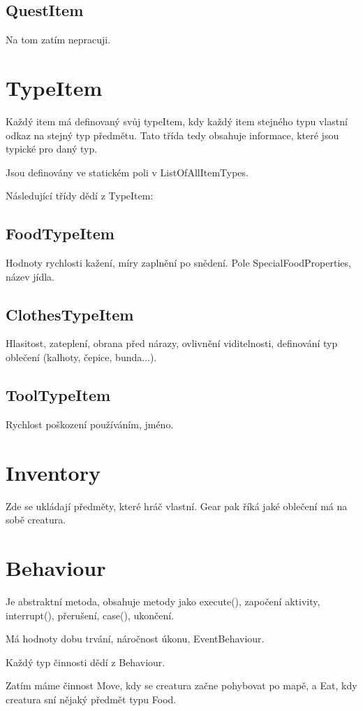 \documentclass[12pt,a4paper]{report}
\begin{document}
\subsection{QuestItem}
Na tom zatím nepracuji.

\section{TypeItem}
Každý item má definovaný svůj typeItem, kdy každý item stejného typu vlastní odkaz na stejný typ předmětu. Tato třída tedy obsahuje informace, které jsou typické pro daný typ.

Jsou definovány ve statickém poli v ListOfAllItemTypes.

Následující třídy dědí z TypeItem:

\subsection{FoodTypeItem}
Hodnoty rychlosti kažení, míry zaplnění po snědení. Pole SpecialFoodProperties, název jídla.

\subsection{ClothesTypeItem}
Hlasitost, zateplení, obrana před nárazy, ovlivnění viditelnosti, definování typ oblečení (kalhoty, čepice, bunda...).

\subsection{ToolTypeItem}
Rychlost poškození používáním, jméno.


\section{Inventory}
Zde se ukládají předměty, které hráč vlastní. Gear pak říká jaké oblečení má na sobě creatura.

\section{Behaviour}
Je abstraktní metoda, obsahuje metody jako execute(), započení aktivity, interrupt(), přerušení, case(), ukončení.

Má hodnoty dobu trvání, náročnost úkonu, EventBehaviour.

Každý typ činnosti dědí z Behaviour.

Zatím máme činnost Move, kdy se creatura začne pohybovat po mapě, a Eat, kdy creatura sní nějaký předmět typu Food.
\end{document}
